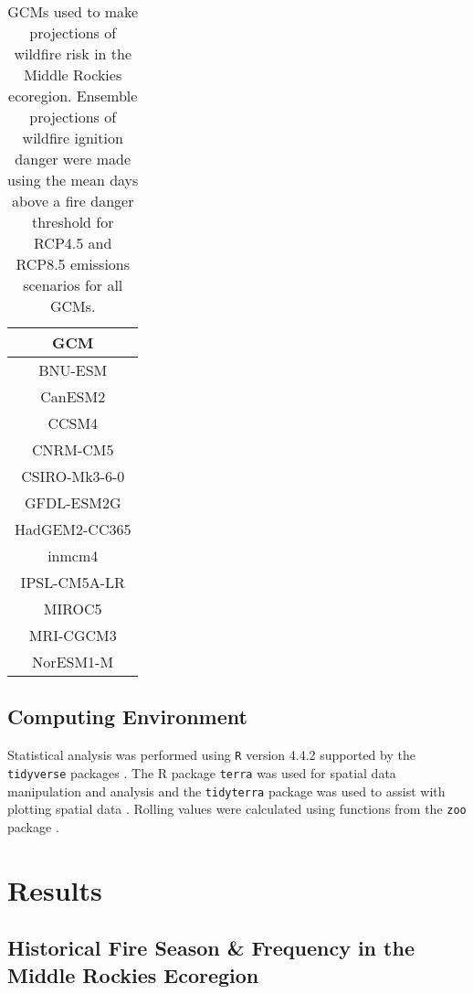 \documentclass[11p]{article}
\begin{document}
\begin{table}[htbp]
  \centering
  \begin{tabular}{ c }
    \hline
    GCM \\
    \hline
    BNU-ESM \\
    CanESM2 \\
    CCSM4 \\
    CNRM-CM5 \\
    CSIRO-Mk3-6-0 \\
    GFDL-ESM2G \\
    HadGEM2-CC365 \\
    inmcm4 \\
    IPSL-CM5A-LR \\
    MIROC5 \\
    MRI-CGCM3 \\
    NorESM1-M \\
    \hline
  \end{tabular}
  \caption{GCMs used to make projections of wildfire risk in the Middle Rockies ecoregion. Ensemble projections of wildfire ignition danger were made using the mean days above a fire danger threshold for RCP4.5 and RCP8.5 emissions scenarios for all GCMs.}
  \label{table:gcms}
\end{table}

\subsection{Computing Environment}

Statistical analysis was performed using \texttt{R} version 4.4.2 \citep{rcoreteamLanguageEnvironmentStatistical2024} supported by the \texttt{tidyverse} packages \citep{hernangomezUsingTidyverseTerra2023} . The R package \texttt{terra} was used for spatial data manipulation and analysis \citep{hijmansTerraSpatialData2024} and the \texttt{tidyterra} package was used to assist with plotting spatial data \citep{hernangomezUsingTidyverseTerra2023}. Rolling values were calculated using functions from the \texttt{zoo} package \citep{zeileisZooS3Infrastructure2005}.  

\section{Results}

\subsection{Historical Fire Season \& Frequency in the Middle Rockies Ecoregion}
\end{document}
